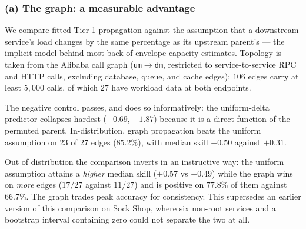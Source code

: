 \documentclass[journal, 10pt]{IEEEtran}
\begin{document}
\subsubsection{(a) The graph: a measurable advantage}
\label{sec:rq5-graph}

We compare fitted Tier-1 propagation against the assumption that a downstream
service's load changes by the same percentage as its upstream parent's --- the
implicit model behind most back-of-envelope capacity estimates. Topology is taken
from the Alibaba call graph (\texttt{um}$\to$\texttt{dm}, restricted to
service-to-service RPC and HTTP calls, excluding database, queue, and cache
edges); $106$ edges carry at least $5{,}000$ calls, of which $27$ have workload
data at both endpoints.

\begin{table}[!t]
\centering
\caption{RQ5a: graph propagation versus uniform-delta, Alibaba v2021, 27 Tier-1
edges. Skill is relative to a constant predictor.}
\label{tab:rq5-graph}
\end{table}

The negative control passes, and does so informatively: the uniform-delta
predictor collapses hardest ($-0.69$, $-1.87$) because it is a direct function of
the permuted parent. In-distribution, graph propagation beats the uniform
assumption on $23$ of $27$ edges ($85.2\%$), with median skill $+0.50$ against
$+0.31$.

Out of distribution the comparison inverts in an instructive way: the uniform
assumption attains a \emph{higher} median skill ($+0.57$ vs $+0.49$) while the
graph wins on \emph{more} edges ($17/27$ against $11/27$) and is positive on
$77.8\%$ of them against $66.7\%$. The graph trades peak accuracy for
consistency. This supersedes an earlier version of this comparison on Sock Shop,
where six non-root services and a bootstrap interval containing zero could not
separate the two at all.
\end{document}
